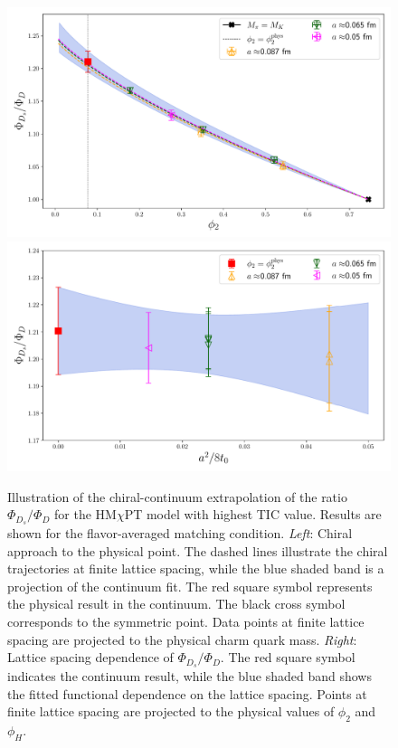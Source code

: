 \begin{figure}
	\centering
	\includegraphics[scale=0.23]{./cap6/figs/fds/fit_fds_ratio_fds_over_fd.pdf}
	\includegraphics[scale=0.23]{./cap6/figs/fds/fit_cl_fds_ratio_fds.pdf}
	\caption{Illustration of the chiral-continuum extrapolation of the ratio $\Phi_{D_s}/\Phi_D$ for the HM$\chi$PT model with highest TIC value. Results are shown for the flavor-averaged matching condition. \textit{Left}:  Chiral approach to the physical point. The dashed lines illustrate the chiral trajectories at finite lattice spacing, while the blue shaded band is a projection of the continuum fit. The red square symbol represents the physical result in the continuum. The black cross symbol corresponds to the symmetric point. Data points at finite lattice spacing are projected to the physical charm quark mass. \textit{Right}: Lattice spacing dependence of  $\Phi_{D_s}/\Phi_D$. The red square symbol indicates the continuum result, while the blue shaded band shows the fitted functional dependence on the lattice spacing.  Points at finite lattice spacing are projected to the physical values of $\phi_2$ and $\phi_H$.}
	\label{fig:fds_ratio}
\end{figure}

